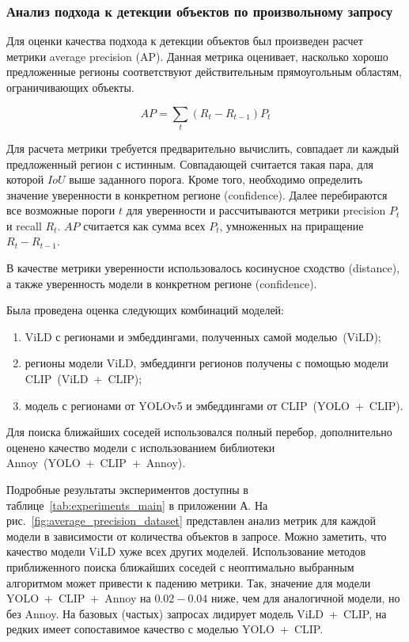 \documentclass[a4paper,14pt]{article}
\begin{document}
    \subsubsection{Анализ подхода к детекции объектов по произвольному запросу} \label{fsod_exp}

    Для оценки качества подхода к детекции объектов был произведен расчет метрики average precision (AP).
    Данная метрика оценивает, насколько хорошо предложенные регионы соответствуют действительным прямоугольным областям, ограничивающих объекты.

    $$ AP = \sum_{t} (R_t - R_{t - 1}) P_t $$

    Для расчета метрики требуется предварительно вычислить, совпадает ли каждый предложенный регион с истинным.
    Совпадающей считается такая пара, для которой $IoU$ выше заданного порога.
    Кроме того, необходимо определить значение уверенности в конкретном регионе (confidence).
    Далее перебираются все возможные пороги $t$ для уверенности и рассчитываются метрики precision $P_t$ и recall $R_t$.
    $AP$ считается как сумма всех $P_t$, умноженных на приращение $R_t - R_{t - 1}$.

    В качестве метрики уверенности использовалось косинусное сходство (distance), а также уверенность модели в конкретном регионе (confidence).

    Была проведена оценка следующих комбинаций моделей:
    \begin{enumerate}
        [1)]
        \itemsep0em
        \item ViLD с регионами и эмбеддингами, полученных самой моделью~(ViLD);
        \item регионы модели ViLD, эмбеддинги регионов получены с помощью модели CLIP~(ViLD~+~CLIP);
        \item модель с регионами от YOLOv5 и эмбеддингами от CLIP~(YOLO~+~CLIP).
    \end{enumerate}
    Для поиска ближайших соседей использовался полный перебор, дополнительно оценено качество модели с использованием библиотеки Annoy~(YOLO~+~CLIP~+~Annoy).


    Подробные результаты экспериментов доступны в таблице~\ref{tab:experiments_main} в приложении А.
    На рис.~\ref{fig:average_precision_dataset} представлен анализ метрик для каждой модели в зависимости от количества объектов в запросе.
    Можно заметить, что качество модели ViLD хуже всех других моделей.
    Использование методов приближенного поиска ближайших соседей с неоптимально выбранным алгоритмом может привести к падению метрики.
    Так, значение для модели YOLO~+~CLIP~+~Annoy на $0.02 - 0.04$ ниже, чем для аналогичной модели, но без Annoy.
    На базовых (частых) запросах лидирует модель ViLD~+~CLIP, на редких имеет сопоставимое качество с моделью YOLO~+~CLIP.
\end{document}
